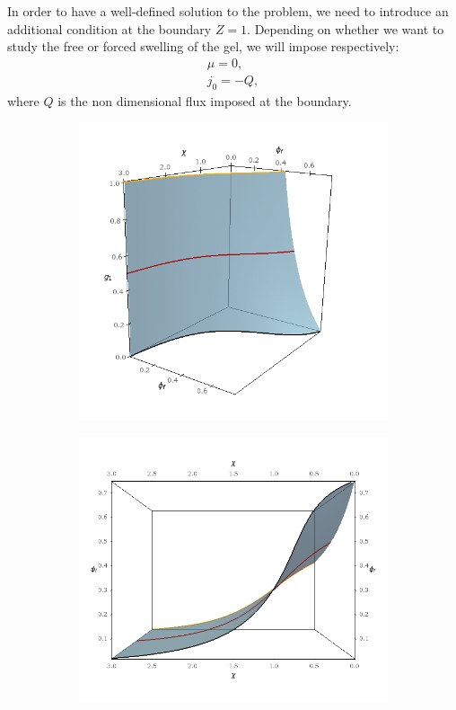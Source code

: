 \documentclass[12pt]{extarticle}
\begin{document}
In order to have a well-defined solution to the problem, we need to introduce an additional condition at the boundary $Z=1$. Depending on whether we want to study the free or forced swelling of the gel, we will impose respectively:
\begin{eqnarray}
\mu=0,\label{mu1}\\
j_0=-Q,
\end{eqnarray}
where $Q$ is the non dimensional flux imposed at the boundary.

\begin{figure}
	\begin{subfigure}{0.49\textwidth}
		\hspace{-5mm}
		\includegraphics[scale=0.37]{images/trial3}
		\caption{}
	\end{subfigure}
	\begin{subfigure}{0.49\textwidth}
		\includegraphics[scale=0.37]{images/trial2}
		\caption{}
	\end{subfigure}
	

\end{figure}
\end{document}
